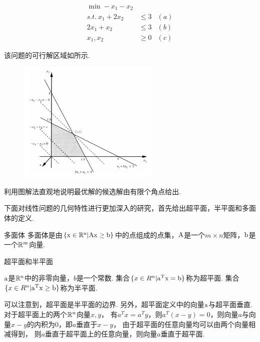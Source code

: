 \documentclass[12pt,oneside,UTF8]{ctexbook} %
\begin{document}
\begin{spacing}{1.5}
\begin{equation}
  \begin{aligned}
\min -x_1-x_2\\
s.t.\     x_1+2x_2 &\leq 3 & (a)\\
          2x_1+x_2 &\leq 3& (b)\\
		x_1,x_2&\geq 0&(c)
  \end{aligned}
  \label{equ:example1}
\end{equation}

该问题的可行解区域如所示.

\begin{figure}[htbp]
    \centering
    \includegraphics[width=0.6\textwidth]{figure/ch1/feasible_region1.png}
    \caption{}
    \label{fig:feasible_region1}
\end{figure}

利用图解法直观地说明最优解的候选解由有限个角点给出. 

下面对线性问题的几何特性进行更加深入的研究，首先给出超平面，半平面和多面体的定义.

\begin{definition}{多面体}{}
    多面体是由$\{\rm x\in \mathbb{R}^n|\rm Ax\geq b\}$中的点组成的点集，$\rm A$是一个$m\times n$矩阵，$\rm b$是一个$\mathbb{R}^m$向量.
    
\end{definition}

\begin{definition}{超平面和半平面}{}
    
    $\rm a$是$\rm\mathbb{R}^n$中的非零向量，$b$是一个常数.
    集合$\{x\in R^n|\rm a^Tx=b\}$称为超平面.
    集合$\{x\in R^n|\rm a^Tx\geq b\}$称为半平面.
    
\end{definition}

\begin{remark}
    可以注意到，超平面是半平面的边界. 
    另外，超平面定义中的向量$\rm a$与超平面垂直. 对于超平面上的两个$\mathbb{R}^n$向量$x, y$，
    有$a^Tx=a^Ty$，则$a^T(x-y)=0$，则向量$a$与向量$x-y$的内积为0，即$a$垂直于$x-y$，
    由于超平面的任意向量均可以由两个向量相减得到，
    则$a$垂直于超平面上的任意向量，则向量$a$垂直于超平面.
\end{remark}


\end{spacing}
\end{document}
